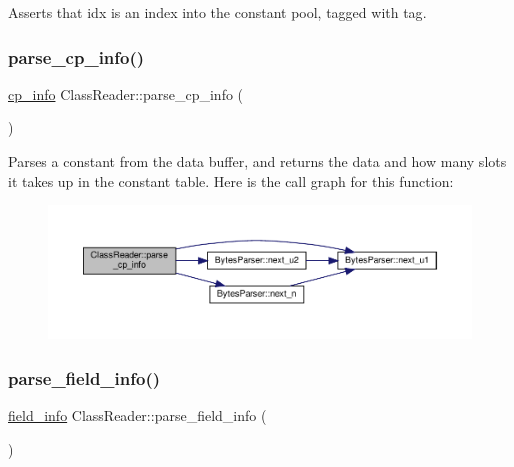 Asserts that {\ttfamily idx} is an index into the constant pool, tagged with {\ttfamily tag}. \mbox{\label{classClassReader_ac4c0b613d45cf507b2e85c61c28541cb}} 
\subsubsection{\texorpdfstring{parse\+\_\+cp\+\_\+info()}{parse\_cp\_info()}}
{\footnotesize\ttfamily \hyperlink{structcp__info}{cp\+\_\+info} Class\+Reader\+::parse\+\_\+cp\+\_\+info (\begin{DoxyParamCaption}{ }\end{DoxyParamCaption})\hspace{0.3cm}{\ttfamily [private]}}

Parses a constant from the data buffer, and returns the data and how many slots it takes up in the constant table. Here is the call graph for this function\+:\nopagebreak
\begin{figure}[H]
\begin{center}
\leavevmode
\includegraphics[width=350pt]{classClassReader_ac4c0b613d45cf507b2e85c61c28541cb_cgraph}
\end{center}
\end{figure}
\mbox{\label{classClassReader_a434b73f04e1502c936593ab63094d838}} 
\subsubsection{\texorpdfstring{parse\+\_\+field\+\_\+info()}{parse\_field\_info()}}
{\footnotesize\ttfamily \hyperlink{structfield__info}{field\+\_\+info} Class\+Reader\+::parse\+\_\+field\+\_\+info (\begin{DoxyParamCaption}{ }\end{DoxyParamCaption})\hspace{0.3cm}{\ttfamily [private]}}



